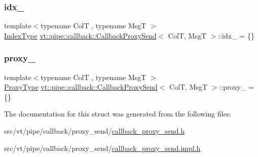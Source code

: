 \mbox{\label{structvt_1_1pipe_1_1callback_1_1_callback_proxy_send_a1a9b4802acd720bc1fa50a7ebcb0c49e}} 
\subsubsection{\texorpdfstring{idx\+\_\+}{idx\_}}
{\footnotesize\ttfamily template$<$typename ColT , typename MsgT $>$ \\
\hyperlink{structvt_1_1pipe_1_1callback_1_1_callback_proxy_send_adf233dca6b029304153ba59fecf6113f}{Index\+Type} \hyperlink{structvt_1_1pipe_1_1callback_1_1_callback_proxy_send}{vt\+::pipe\+::callback\+::\+Callback\+Proxy\+Send}$<$ ColT, MsgT $>$\+::idx\+\_\+ = \{\}\hspace{0.3cm}{\ttfamily [private]}}

\mbox{\label{structvt_1_1pipe_1_1callback_1_1_callback_proxy_send_a324fc5697bd625cf1a3f8961855886d9}} 
\subsubsection{\texorpdfstring{proxy\+\_\+}{proxy\_}}
{\footnotesize\ttfamily template$<$typename ColT , typename MsgT $>$ \\
\hyperlink{structvt_1_1pipe_1_1callback_1_1_callback_proxy_send_a2aece7c6f8bd17a4c0b1fdca75d84579}{Proxy\+Type} \hyperlink{structvt_1_1pipe_1_1callback_1_1_callback_proxy_send}{vt\+::pipe\+::callback\+::\+Callback\+Proxy\+Send}$<$ ColT, MsgT $>$\+::proxy\+\_\+ = \{\}\hspace{0.3cm}{\ttfamily [private]}}



The documentation for this struct was generated from the following files\+:\begin{DoxyCompactItemize}
\item 
src/vt/pipe/callback/proxy\+\_\+send/\hyperlink{callback__proxy__send_8h}{callback\+\_\+proxy\+\_\+send.\+h}\item 
src/vt/pipe/callback/proxy\+\_\+send/\hyperlink{callback__proxy__send_8impl_8h}{callback\+\_\+proxy\+\_\+send.\+impl.\+h}\end{DoxyCompactItemize}
